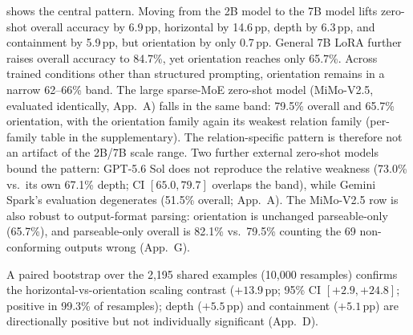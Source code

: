 \documentclass[10pt,twocolumn,letterpaper]{article}
\newcommand{\modelfrontier}{MiMo-V2.5}
\newcommand{\pp}{\,pp}
\begin{document}
 shows the central pattern. Moving from the 2B model to the 7B model lifts zero-shot overall accuracy by 6.9\pp, horizontal by 14.6\pp, depth by 6.3\pp, and containment by 5.9\pp, but orientation by only 0.7\pp. General 7B LoRA further raises overall accuracy to 84.7\%, yet orientation reaches only 65.7\%. Across trained conditions other than structured prompting, orientation remains in a narrow 62--66\% band. The large sparse-MoE zero-shot model (\modelfrontier{}, evaluated identically, App.~A) falls in the same band: 79.5\% overall and 65.7\% orientation, with the orientation family again its weakest relation family (per-family table in the supplementary). The relation-specific pattern is therefore not an artifact of the 2B/7B scale range. Two further external zero-shot models bound the pattern: GPT-5.6 Sol does not reproduce the relative weakness (73.0\% vs.\ its own 67.1\% depth; CI $[65.0, 79.7]$ overlaps the band), while Gemini Spark's evaluation degenerates (51.5\% overall; App.~A). The \modelfrontier{} row is also robust to output-format parsing: orientation is unchanged parseable-only (65.7\%), and parseable-only overall is 82.1\% vs.\ 79.5\% counting the 69 non-conforming outputs wrong (App.~G).

A paired bootstrap over the 2,195 shared examples (10{,}000 resamples) confirms the horizontal-vs-orientation scaling contrast ($+13.9$\pp; 95\% CI $[+2.9, +24.8]$; positive in 99.3\% of resamples); depth ($+5.5$\pp) and containment ($+5.1$\pp) are directionally positive but not individually significant (App.~D).
\end{document}
